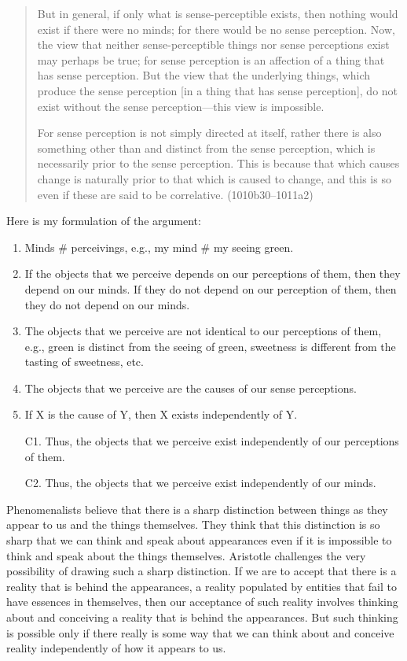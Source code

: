 \documentclass[article,oneside]{memoir}
\begin{document}
\begin{quote}
 But in general, if only what is sense-perceptible exists, then nothing would exist if there were no minds; for there would be no sense perception. Now, the view that neither sense-perceptible things nor sense perceptions exist may perhaps be true; for sense perception is an affection of a thing that has sense perception. But the view that the underlying things, which produce the sense perception [in a thing that has sense perception], do not exist without the sense perception---this view is impossible.

For sense perception is not simply directed at itself, rather there is also something other than and distinct from the sense perception, which is necessarily prior to the sense perception. This is because that which causes change is naturally prior to that which is caused to change, and this is so even if these are said to be correlative. (1010b30–1011a2)
\end{quote}
Here is my formulation of the argument: 
\begin{enumerate}
\item Minds \# perceivings, e.g., my mind \# my seeing green.
\item If the objects that we perceive depends on our perceptions of them, then they depend on our minds. If they do not depend on our perception of them, then they do not depend on our minds.
\item The objects that we perceive are not identical to our perceptions of them, e.g., green is distinct from the seeing of green, sweetness is different from the tasting of sweetness, etc. 
\item The objects that we perceive are the causes of our sense perceptions.
\item If X is the cause of Y, then X exists independently of Y.
\item[C1.] Thus, the objects that we perceive exist independently of our perceptions of them.
 \item[C2.] Thus, the objects that we perceive exist independently of our minds. 
\end{enumerate}
Phenomenalists believe that there is a sharp distinction between things as they appear to us and the things themselves. They think that this distinction is so sharp that we can think and speak about appearances even if it is impossible to think and speak about the things themselves. Aristotle challenges the very possibility of drawing such a sharp distinction. If we are to accept that there is a reality that is behind the appearances, a reality populated by entities that fail to have essences in themselves,  then our acceptance of such reality involves thinking about and conceiving a reality that is behind the appearances. But such thinking is possible only if there really is some way that we can think about and conceive reality independently of how it appears to us.  
\end{document}
